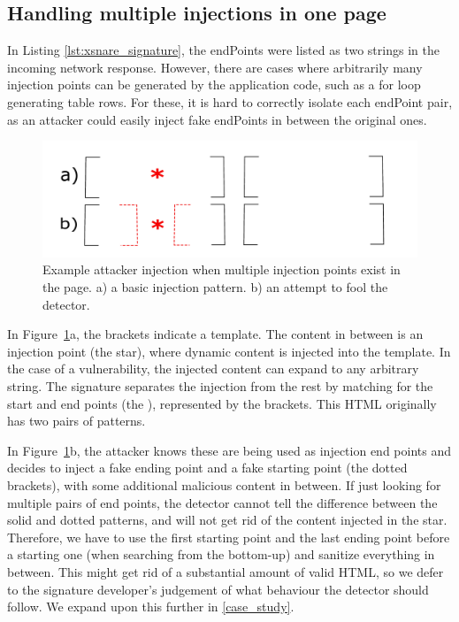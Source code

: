 \subsection{Handling multiple injections in one page} \label{multiple_injections}
In Listing \ref{lst:xsnare_signature}, the endPoints were listed as two strings in the incoming network response. However, there are cases where arbitrarily many injection points can be generated by the application code, such as a for loop generating table rows. For these, it is hard to correctly isolate each endPoint pair, as an attacker could easily inject fake endPoints in between the original ones.

\begin{figure}[h]
	\includegraphics[scale=0.25]{img/attacker_injection_compound.pdf}
	\caption{Example attacker injection when multiple injection points exist in the page. a) a basic injection pattern. b) an attempt to fool the detector.}
	\label{fig:attacker_injection}
\end{figure}

In Figure~\ref{fig:attacker_injection}a, the brackets indicate a template. The content in between is an injection point (the star), where dynamic content is injected into the template. In the case of a vulnerability, the injected content can expand to any arbitrary string. The signature separates the injection from the rest by matching for the start and end points (the ), represented by the brackets. This HTML originally has two pairs of  patterns.

In Figure~\ref{fig:attacker_injection}b, the attacker knows these are being used as injection end points and decides to inject a fake ending point and a fake starting point (the dotted brackets), with some additional malicious content in between. If just looking for multiple pairs of end points, the detector cannot tell the difference between the solid and dotted patterns, and will not get rid of the content injected in the star. Therefore, we have to use the first starting point and the last ending point before a starting one (when searching from the bottom-up) and sanitize everything in between. This might get rid of a substantial amount of valid HTML, so we defer to the signature developer's judgement of what behaviour the detector should follow. We expand upon this further in \autoref{case_study}.


